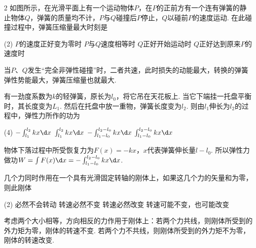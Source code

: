 \begin{problem}
\begin{paracol}{2}
    如图所示，在光滑平面上有一个运动物体$P$，在$P$的正前方有一个连有弹簧的静止物体$Q$，弹簧的质量均不计，$P$与$Q$碰撞后$P$停止，$Q$以碰前$P$的速度运动. 在此碰撞过程中，弹簧压缩量最大时刻是
    \switchcolumn\centering
\end{paracol}
\begin{tasks}(2)
    \task $P$的速度正好变为零时
    \task[\true] $P$与$Q$速度相等时
    \task $Q$正好开始运动时
    \task $Q$正好达到原来$P$的速度时
\end{tasks}
\end{problem}
\begin{solution}
    当$P$、$Q$发生``完全非弹性碰撞''时，二者共速，此时损失的动能最大，转换的弹簧弹性势能最大，弹簧压缩量也就最大.
\end{solution}

\begin{problem}
有一劲度系数为$k$的轻弹簧，原长为$l_0$，将它吊在天花板上. 当它下端挂一托盘平衡时，其长度变为$L_1$. 然后在托盘中放一重物，弹簧长度变为$l_2$. 则由$l_1$伸长为$l_2$的过程中，弹性力所作的功为
\begin{tasks}(4)
    \task $-\int_{l_1}^{l_2}kx\d x$
    \task $\int_{l_1}^{l_2}kx\d x$
    \task[\true] $-\int_{l_1-l_0}^{l_2-l_0}kx\d x$
    \task $\int_{l_1-l_0}^{l_2-l_0}kx\d x$
\end{tasks}
\end{problem}
\begin{solution}
物体下落过程中所受恢复力为$F(x)=-kx$，$x$代表弹簧伸长量$l-l_0$. 所以弹性力做功$W=\int{F(x)\d x}=-\int_{l_1-l_0}^{l_2-l_0}kx\d x$.


\end{solution}
\begin{problem}
几个力同时作用在一个具有光滑固定转轴的刚体上，如果这几个力的矢量和为零，则此刚体
\begin{tasks}(2)
    \task 必然不会转动
    \task 转速必然不变
    \task 转速必然改变
    \task[\true] 转速可能不变，也可能改变
\end{tasks}
\end{problem}
\begin{solution}
考虑两个大小相等，方向相反的力作用于刚体上：若两个力共线，则刚体所受到的外力矩为零，刚体的转速不变. 若两个力不共线，则刚体所受到的外力矩不为零，刚体的转速改变.
\end{solution}

